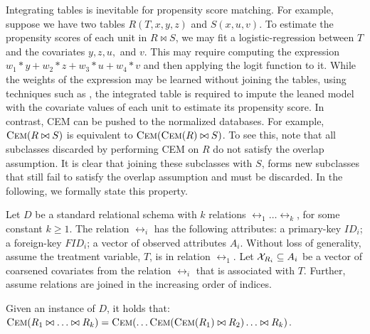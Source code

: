 Integrating tables is inevitable for propensity score matching. For example, suppose we have two tables
$R(T,x,y,z)$ and $S(x,u,v)$. To estimate the propensity scores of each unit in $R \bowtie S$, we may fit
a logistic-regression between $T$ and  the covariates $y,z,u,$ and $v$. This may require computing the expression $w_1*y + w_2*z + w_3*u + w_4*v$ and then applying the logit function to it.  While the weights of the expression may be learned without joining the tables, using techniques such as \cite{schleich2016learning}, the integrated table is required to impute the leaned model with the covariate values of each unit to estimate its propensity score. In contrast,  CEM can be pushed
to the normalized databases. For example, ${\textsc{Cem}}(R \bowtie S)$ is equivalent to ${\textsc{Cem}}({\textsc{Cem}}(R)\bowtie S)$. To see this, note that all subclasses discarded by performing CEM on $R$ do not satisfy the overlap assumption. It is clear that joining these subclasses with $S$, forms new subclasses that still fail to satisfy the overlap assumption and must be discarded. In the following, we formally state this property.







Let $D$ be a standard relational schema with $k$ relations
$\rel_1 \ldots \rel_k$, for some constant $k \geq 1$. The relation $\rel_i$
has the following attributes:  a  primary-key $ID_i $;  a foreign-key $FID_i $;   a vector of observed attributes
 $A_i$.  Without loss of generality, assume the treatment variable, $T$, is in relation $\rel_1$.  Let
  ${{\mathcal{X}}}_{{{R}}_i} \subseteq {A}_i$ be a vector of coarsened covariates from the relation $\rel_i$ that is associated with $T$.
    Further, assume relations are joined in the increasing order of indices.


\vspace{-.2cm}
\begin{proposition} \label{pro:push}
Given an instance of $D$, it holds that: ${\textsc{Cem}}({{R}}_1  \bowtie
\ldots  \bowtie{{R}}_{k})= {\textsc{Cem}}( \ldots {\textsc{Cem}}({\textsc{Cem}}(R_1) \bowtie   R_2) \ldots  \bowtie R_{k}) $.
\end{proposition}

